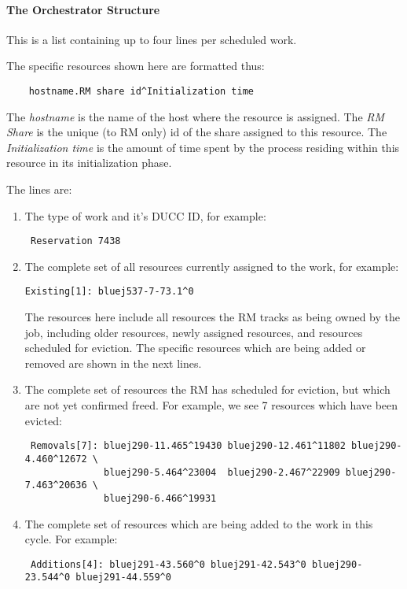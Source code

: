    \paragraph{The Orchestrator Structure}
      This is a list containing up to four lines per scheduled work.  
      
      The specific resources shown here are formatted thus:
\begin{verbatim}
    hostname.RM share id^Initialization time
\end{verbatim}
      The {\em hostname} is the name of the host where the resource is assigned.  The {\em RM Share}
      is the unique (to RM only) id of the share assigned to this resource.  The {\em Initialization time}
      is the amount of time spent by the process residing within this resource in its initialization phase.
      
      The lines are:
      \begin{enumerate}
        \item The type of work and it's DUCC ID, for example: 
\begin{verbatim}
 Reservation 7438
\end{verbatim}
        \item The complete set of all resources currently assigned to the work, for example:
\begin{verbatim}
Existing[1]: bluej537-7-73.1^0
\end{verbatim}
          The resources here include all resources the RM tracks as being owned by the job, including
          older resources, newly assigned resources, and resources scheduled for eviction.  The specific
          resources which are being added or removed are shown in the next lines.
          
        \item The complete set of resources the RM has scheduled for eviction, but which are not
          yet confirmed freed.  For example, we see 7 resources which have been evicted:
\begin{verbatim}
 Removals[7]: bluej290-11.465^19430 bluej290-12.461^11802 bluej290-4.460^12672 \
              bluej290-5.464^23004  bluej290-2.467^22909 bluej290-7.463^20636 \
              bluej290-6.466^19931 
\end{verbatim}

        \item The complete set of resources which are being added to the work in this cycle.  For
          example:

\begin{verbatim}
 Additions[4]: bluej291-43.560^0 bluej291-42.543^0 bluej290-23.544^0 bluej291-44.559^0 
\end{verbatim}
      \end{enumerate}
         
